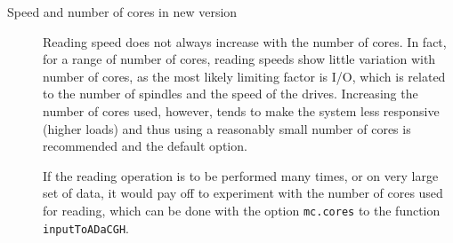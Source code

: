 \documentclass[a4paper,11pt]{article}
\begin{document}
\begin{description}
  


\item[Speed and number of cores in new version] Reading speed does not
  always increase with the number of cores. In fact, for a range of number
  of cores, reading speeds show little variation with number of cores, as
  the most likely limiting factor is I/O, which is related to the number
  of spindles and the speed of the drives. Increasing the number of cores
  used, however, tends to make the system less responsive (higher loads)
  and thus using a reasonably small number of cores is recommended and the
  default option.



  If the reading operation is to be performed many times, or on very large
  set of data, it would pay off to experiment with the number of cores
  used for reading, which can be done with the option \texttt{mc.cores} to
  the function \texttt{inputToADaCGH}.

\end{description}
\end{document}

